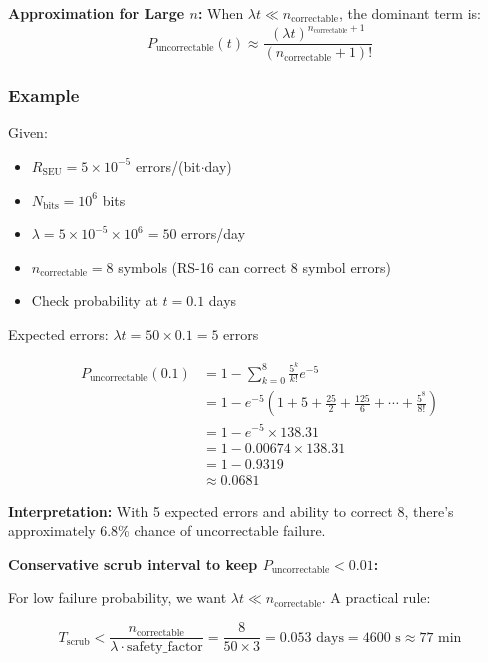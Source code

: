 \documentclass[11pt,a4paper]{article}
\begin{document}
\textbf{Approximation for Large $n$:} When $\lambda t \ll n_{\text{correctable}}$, the dominant term is:
\begin{equation}
P_{\text{uncorrectable}}(t) \approx \frac{(\lambda t)^{n_{\text{correctable}}+1}}{(n_{\text{correctable}}+1)!}
\end{equation}

\subsubsection{Example}

Given:
\begin{itemize}
    \item $R_{\text{SEU}} = 5 \times 10^{-5}$ errors/(bit$\cdot$day)
    \item $N_{\text{bits}} = 10^6$ bits
    \item $\lambda = 5 \times 10^{-5} \times 10^6 = 50$ errors/day
    \item $n_{\text{correctable}} = 8$ symbols (RS-16 can correct 8 symbol errors)
    \item Check probability at $t = 0.1$ days
\end{itemize}

Expected errors: $\lambda t = 50 \times 0.1 = 5$ errors

\begin{align}
P_{\text{uncorrectable}}(0.1) &= 1 - \sum_{k=0}^{8} \frac{5^k}{k!} e^{-5} \\
&= 1 - e^{-5} \left(1 + 5 + \frac{25}{2} + \frac{125}{6} + \cdots + \frac{5^8}{8!}\right) \\
&= 1 - e^{-5} \times 138.31 \\
&= 1 - 0.00674 \times 138.31 \\
&= 1 - 0.9319 \\
&\approx 0.0681
\end{align}

\textbf{Interpretation:} With 5 expected errors and ability to correct 8, there's approximately 6.8\% chance of uncorrectable failure.

\textbf{Conservative scrub interval to keep $P_{\text{uncorrectable}} < 0.01$:}

For low failure probability, we want $\lambda t \ll n_{\text{correctable}}$. A practical rule:

\begin{equation}
T_{\text{scrub}} < \frac{n_{\text{correctable}}}{\lambda \cdot \text{safety\_factor}} = \frac{8}{50 \times 3} = 0.053 \text{ days} = 4600 \text{ s} \approx 77 \text{ min}
\end{equation}
\end{document}
